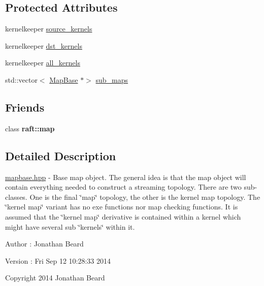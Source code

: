 \subsection*{Protected Attributes}
\begin{DoxyCompactItemize}
\item 
kernelkeeper \hyperlink{class_map_base_a2541cb37a237e66fc88129f9f0b02f50}{source\+\_\+kernels}
\item 
kernelkeeper \hyperlink{class_map_base_a83bb7ac6b0e80882356946d19da7ce4a}{dst\+\_\+kernels}
\item 
kernelkeeper \hyperlink{class_map_base_a2220cd630c5d00708f08d9bc70a48220}{all\+\_\+kernels}
\item 
std\+::vector$<$ \hyperlink{class_map_base}{Map\+Base} $\ast$$>$ \hyperlink{class_map_base_abc4856ed552e77510211851f0a4a02ab}{sub\+\_\+maps}
\end{DoxyCompactItemize}
\subsection*{Friends}
\begin{DoxyCompactItemize}
\item 
\hypertarget{class_map_base_aa25a3986fa3c9242f434168844d4ddfb}{}\label{class_map_base_aa25a3986fa3c9242f434168844d4ddfb} 
class {\bfseries raft\+::map}
\end{DoxyCompactItemize}


\subsection{Detailed Description}
\hyperlink{mapbase_8hpp_source}{mapbase.\+hpp} -\/ Base map object. The general idea is that the map object will contain everything needed to construct a streaming topology. There are two sub-\/classes. One is the final \char`\"{}map\char`\"{} topology, the other is the kernel map topology. The \char`\"{}kernel map\char`\"{} variant has no exe functions nor map checking functions. It is assumed that the \char`\"{}kernel map\char`\"{} derivative is contained within a kernel which might have several sub \char`\"{}kernels\char`\"{} within it.

\begin{DoxyAuthor}{Author}
\+: Jonathan Beard 
\end{DoxyAuthor}
\begin{DoxyVersion}{Version}
\+: Fri Sep 12 10\+:28\+:33 2014
\end{DoxyVersion}
Copyright 2014 Jonathan Beard

